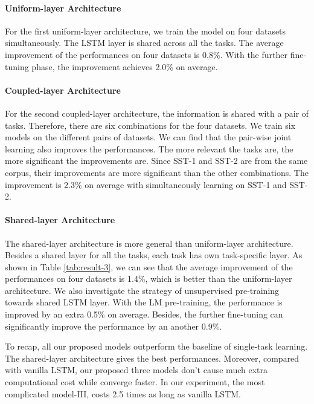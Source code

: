 \documentclass{article}
\begin{document}
\paragraph{Uniform-layer Architecture}
For the first uniform-layer architecture, we train the model on four datasets simultaneously. The LSTM layer is shared across all the tasks. The average improvement of the performances on four datasets is 0.8\%. With the further fine-tuning phase, the improvement achieves 2.0\% on average.

\paragraph{Coupled-layer Architecture}
For the second coupled-layer architecture, the information is shared with a pair of tasks. Therefore, there are six combinations for the four datasets. We train six models on the different pairs of datasets. We can find that the pair-wise joint learning also improves the performances. The more relevant the tasks are, the more significant the improvements are. Since SST-1 and SST-2 are from the same corpus, their improvements are more significant than the other combinations. The improvement is 2.3\% on average with simultaneously learning on SST-1 and SST-2.

\paragraph{Shared-layer Architecture}

The shared-layer architecture is more general than uniform-layer architecture. Besides a shared layer for all the tasks, each task has own task-specific layer. As shown in Table \ref{tab:result-3}, we can see that the average improvement of the performances on four datasets is 1.4\%, which is better than the uniform-layer architecture. We also investigate the strategy of unsupervised pre-training towards shared LSTM layer. With the LM pre-training, the performance is improved by an extra 0.5\% on average. Besides, the further fine-tuning can significantly improve the performance by an another 0.9\%.


To recap, all our proposed models outperform the baseline of single-task learning. The shared-layer architecture gives the best performances. Moreover, compared with  vanilla LSTM, our proposed three models don't cause much extra computational cost while  converge faster. In our experiment, the most complicated model-III, costs  2.5 times as long as vanilla LSTM.
\end{document}
